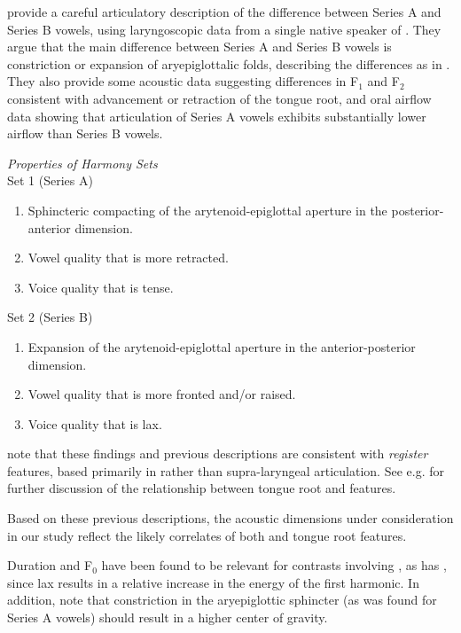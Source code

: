 \documentclass[output=paper,newtxmath,modfonts,nonflat,hidelinks]{langsci/langscibook}
\begin{document}
\cite{Edmondsonetal2004} provide a careful articulatory description of the difference between Series A and Series B vowels, using laryngoscopic data from a single native speaker of .  They argue that the main difference between Series A and Series B vowels is constriction or expansion of aryepiglottalic folds, describing the differences as in .  They also provide some acoustic data suggesting differences in F$_1$ and F$_2$ consistent with advancement or retraction of the tongue root, and oral airflow data showing that articulation of Series A vowels exhibits substantially lower airflow than Series B vowels.

\ea\label{ex:kbgy:1} \emph{Properties of Harmony Sets \citep{Edmondsonetal2004}}\\
{Set 1 (Series A)}
\begin{enumerate}
\item Sphincteric compacting of the arytenoid-epiglottal aperture in the posterior-anterior dimension.
\item Vowel quality that is more retracted.
\item Voice quality that is tense.
\end{enumerate}
{Set 2 (Series B)}
\begin{enumerate}
\item Expansion of the arytenoid-epiglottal aperture in the anterior-posterior dimension.
\item Vowel quality that is more fronted and/or raised.
\item Voice quality that is lax.
\end{enumerate}
\z

\cite{Edmondsonetal2004} note that these findings and previous descriptions are consistent with \textit{register} features, based primarily in  rather than supra-laryngeal articulation.  See e.g. \citet{Trigo1991} for further discussion of the relationship between tongue root and  features. 

Based on these previous descriptions, the acoustic dimensions under consideration in our study reflect the likely correlates of both  and tongue root features.  

Duration and F$_0$ have been found to be relevant for contrasts involving  \citep{EdmondsonLi1994,HalleStevens1969}, as has  \citep{Kingstonetal1997}, since lax  results in a relative increase in the energy of the first harmonic.  In addition, \cite{Edmondsonetal2007} note that constriction in the aryepiglottic sphincter (as was found for Series A vowels) should result in a higher center of gravity.
\end{document}
